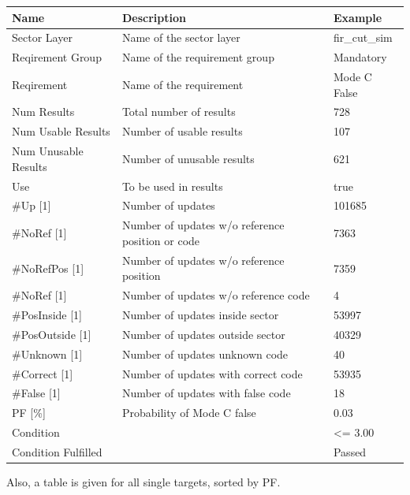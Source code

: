 \begin{center}
 \begin{table}[H]
  \begin{tabularx}{\textwidth}{ | l | X |  l | }
    \hline
    \textbf{Name} & \textbf{Description} & \textbf{Example} \\ \hline
    Sector Layer & Name of the sector layer & fir\_cut\_sim \\ \hline
    Reqirement Group & Name of the requirement group & Mandatory \\ \hline
    Reqirement & Name of the requirement & Mode C False \\ \hline
    Num Results & Total number of results & 728 \\ \hline
    Num Usable Results & Number of usable results & 107 \\ \hline
    Num Unusable Results & Number of unusable results & 621 \\ \hline
    Use & To be used in results & true \\ \hline
    \#Up [1] & Number of updates & 101685 \\ \hline
    \#NoRef [1] & Number of updates w/o reference position or code & 7363 \\ \hline
    \#NoRefPos [1] & Number of updates w/o reference position  & 7359 \\ \hline
    \#NoRef [1] & Number of updates w/o reference code & 4 \\ \hline
    \#PosInside [1] & Number of updates inside sector & 53997 \\ \hline
    \#PosOutside [1] & Number of updates outside sector & 40329 \\ \hline
    \#Unknown [1] & Number of updates unknown code & 40 \\ \hline
    \#Correct [1] & Number of updates with correct code & 53935 \\ \hline
    \#False [1] & Number of updates with false code & 18 \\ \hline
    PF [\%] & Probability of Mode C false & 0.03 \\ \hline
    Condition &  & <= 3.00 \\ \hline
    Condition Fulfilled &  & Passed \\ \hline
\end{tabularx}
\end{table}
\end{center}

Also, a table is given for all single targets, sorted by PF.

